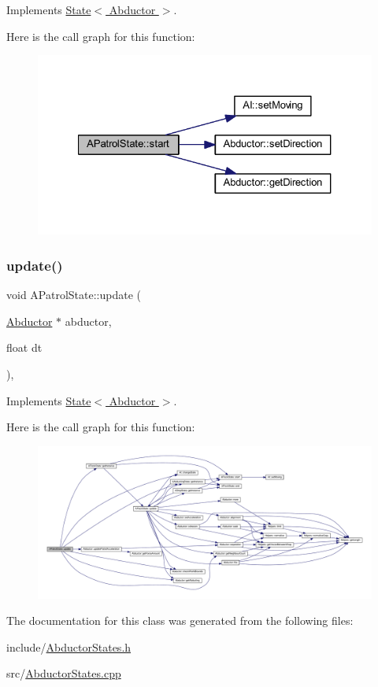 Implements \hyperlink{class_state_abc29d36b0462a306ac9b32f36571d783}{State$<$ Abductor $>$}.

Here is the call graph for this function\+:
\nopagebreak
\begin{figure}[H]
\begin{center}
\leavevmode
\includegraphics[width=327pt]{class_a_patrol_state_ad8772aee88fa833b742c722138d33174_cgraph}
\end{center}
\end{figure}
\mbox{\label{class_a_patrol_state_adc21543780010bc78a157827a7e253b8}} 
\subsubsection{\texorpdfstring{update()}{update()}}
{\footnotesize\ttfamily void A\+Patrol\+State\+::update (\begin{DoxyParamCaption}\item[{\hyperlink{class_abductor}{Abductor} $\ast$}]{abductor,  }\item[{float}]{dt }\end{DoxyParamCaption})\hspace{0.3cm}{\ttfamily [override]}, {\ttfamily [virtual]}}



Implements \hyperlink{class_state_a30b5f87ed3e3a05fafeaf898e43518ea}{State$<$ Abductor $>$}.

Here is the call graph for this function\+:
\nopagebreak
\begin{figure}[H]
\begin{center}
\leavevmode
\includegraphics[width=350pt]{class_a_patrol_state_adc21543780010bc78a157827a7e253b8_cgraph}
\end{center}
\end{figure}


The documentation for this class was generated from the following files\+:\begin{DoxyCompactItemize}
\item 
include/\hyperlink{_abductor_states_8h}{Abductor\+States.\+h}\item 
src/\hyperlink{_abductor_states_8cpp}{Abductor\+States.\+cpp}\end{DoxyCompactItemize}

